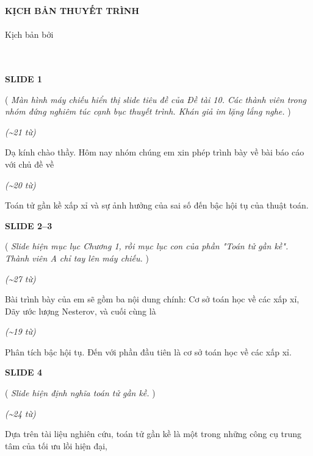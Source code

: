 ﻿\documentclass[12pt]{article}
\newcommand{\scene}[1]{
    \vspace{18pt}
    \normalsize
    \noindent\textbf{\MakeUppercase{#1}}
    \vspace{12pt}
}
\newcommand{\action}[1]{
    \vspace{6pt}
    \small
    \noindent(\textit{#1})
    \vspace{6pt}
}
\newenvironment{speech}{
    \normalsize
    \begin{list}{}{
        \leftmargin=1.25in
        \rightmargin=1.25in
        \parsep=0pt
        \topsep=0pt
        \partopsep=0pt
    }
    \item[]
}{
    \end{list}
    \vspace{6pt}
}
\newcommand{\block}[1]{
    \vspace{4pt}
    \noindent\hspace{1.5in}\textit{(\textasciitilde #1 từ)}
}
\begin{document}
\begin{titlepage}
    \vspace*{144.54pt}
    \begin{center}
        \Huge\textbf{KỊCH BẢN THUYẾT TRÌNH}\\
        \vspace{12pt}
        \large\textit{\mytitle}\\
        \vspace*{144.54pt}
        Kịch bản bởi\\
        \textbf{\mygroup}\\
        \vspace*{108.41pt}
        \mylongschool\\
        \mylongdate
    \end{center}
\end{titlepage}

\scene{SLIDE 1}

\action{
    Màn hình máy chiếu hiển thị slide tiêu đề của Đề tài 10.
    Các thành viên trong nhóm đứng nghiêm túc cạnh bục thuyết trình.
    Khán giả im lặng lắng nghe.
}

\block{21}
\begin{speech}
    Dạ kính chào thầy. Hôm nay nhóm chúng em xin phép trình bày về bài báo cáo với chủ đề về
\end{speech}

\block{20}
\begin{speech}
    Toán tử gần kề xấp xỉ và sự ảnh hưởng của sai số đến bậc hội tụ của thuật toán.
\end{speech}

\scene{SLIDE 2--3}

\action{
    Slide hiện mục lục Chương 1, rồi mục lục con của phần "Toán tử gần kề". Thành viên A chỉ tay lên máy chiếu.
}

\block{27}
\begin{speech}
    Bài trình bày của em sẽ gồm ba nội dung chính: Cơ sở toán học về các xấp xỉ, Dãy ước lượng Nesterov, và cuối cùng là
\end{speech}

\block{19}
\begin{speech}
    Phân tích bậc hội tụ. Đến với phần đầu tiên là cơ sở toán học về các xấp xỉ.
\end{speech}

\scene{SLIDE 4}

\action{
    Slide hiện định nghĩa toán tử gần kề.
}

\block{24}
\begin{speech}
    Dựa trên tài liệu nghiên cứu, toán tử gần kề là một trong những công cụ trung tâm của tối ưu lồi hiện đại,
\end{speech}
\end{document}

